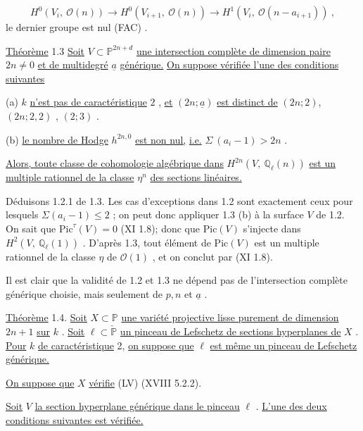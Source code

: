 \begin{equation*}
H^0(V_i,\ \mathcal{O}(n)) \longrightarrow H^0(V_{i+1},\ \mathcal{O}(n)) \longrightarrow H^1(V_i,\ \mathcal{O}(n - a_{i+1}))\ ,
\end{equation*}
le dernier groupe est nul (FAC) .

\underline{Théorème} 1.3 \qquad \underline{Soit} $V \subset \mathbb{P}^{2n+d}$ \underline{une intersection complète de dimension paire} $2n \neq 0$ \underline{et de multidegré} $\underline{a}$ \underline{générique.} \underline{On suppose vérifiée l'une des conditions suivantes}

(a) \quad $k$ \underline{n'est pas de caractéristique} $2$ , \underline{et} $(2n; \underline{a})$ \underline{est distinct de} $(2n; 2)$, $(2n; 2, 2)$ , $(2; 3)$ .

(b) \quad \underline{le nombre de Hodge} $h^{2n,0}$ \underline{est non nul,} \underline{i.e.} $\Sigma\ (a_i-1) > 2n$ .

\underline{Alors, toute classe de cohomologie algébrique dans} $H^{2n}(V,\ \mathbb{Q}_\ell(n))$ \underline{est un multiple rationnel de la classe} $\eta^n$ \underline{des sections linéaires.}

Déduisons 1.2.1 de 1.3. Les cas d'exceptions dans 1.2 sont exactement ceux pour lesquels $\Sigma(a_i -1) \leq 2$ ; on peut donc appliquer 1.3 (b) à la surface $V$ de 1.2. On sait que $\mathrm{Pic}^{\tau}(V) = 0$ (XI 1.8); donc que $\mathrm{Pic}(V)$ s'injecte dans $H^2(V,\ \mathbb{Q}_\ell(1))$ . D'après 1.3, tout élément de $\mathrm{Pic}(V)$ est un multiple rationnel de la classe $\eta$ de $\mathcal{O}(1)$ , et on conclut par (XI 1.8).

Il est clair que la validité de 1.2 et 1.3 ne dépend pas de l'intersection complète générique choisie, mais seulement de $p, n$ et $\underline{a}$ .



\underline{Théorème} 1.4. \quad \underline{Soit} $X \subset \mathbb{P}$ \underline{une variété projective lisse purement de dimension} $2n + 1$ \underline{sur} $k$ . \underline{Soit} $\ell \subset \check{\mathbb{P}}$ \underline{un pinceau de Lefschetz de sections hyperplanes de} $X$ . \underline{Pour} $k$ \underline{de caractéristique} 2, \underline{on suppose que} $\ell$ \underline{est même un pinceau de Lefschetz générique.}

\underline{On suppose que} $X$ \underline{vérifie} (LV)  (XVIII 5.2.2).

\underline{Soit} $V$ \underline{la section hyperplane générique dans le pinceau} $\ell$ . \underline{L'une des deux conditions suivantes est vérifiée.}


